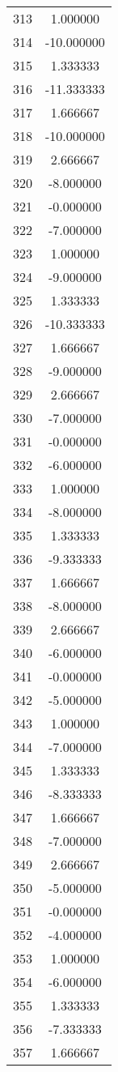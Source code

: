 \documentclass[12pt]{article}
\begin{document}
\begin{longtable}{@{}cc@{}}
313 & 1.000000 \\
314 & -10.000000 \\
315 & 1.333333 \\
316 & -11.333333 \\
317 & 1.666667 \\
318 & -10.000000 \\
319 & 2.666667 \\
320 & -8.000000 \\
321 & -0.000000 \\
322 & -7.000000 \\
323 & 1.000000 \\
324 & -9.000000 \\
325 & 1.333333 \\
326 & -10.333333 \\
327 & 1.666667 \\
328 & -9.000000 \\
329 & 2.666667 \\
330 & -7.000000 \\
331 & -0.000000 \\
332 & -6.000000 \\
333 & 1.000000 \\
334 & -8.000000 \\
335 & 1.333333 \\
336 & -9.333333 \\
337 & 1.666667 \\
338 & -8.000000 \\
339 & 2.666667 \\
340 & -6.000000 \\
341 & -0.000000 \\
342 & -5.000000 \\
343 & 1.000000 \\
344 & -7.000000 \\
345 & 1.333333 \\
346 & -8.333333 \\
347 & 1.666667 \\
348 & -7.000000 \\
349 & 2.666667 \\
350 & -5.000000 \\
351 & -0.000000 \\
352 & -4.000000 \\
353 & 1.000000 \\
354 & -6.000000 \\
355 & 1.333333 \\
356 & -7.333333 \\
357 & 1.666667 \\

\end{longtable}
\end{document}
